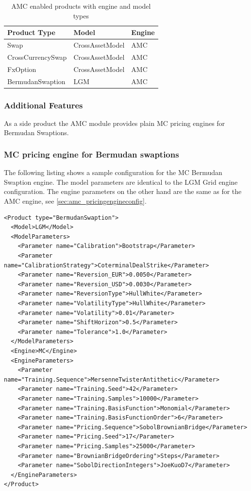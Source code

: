 \begin{table}[hbt]
  \begin{tabular}{l|l|l}
    Product Type & Model & Engine \\ \hline
    Swap & CrossAssetModel & AMC \\
    CrossCurrencySwap & CrossAssetModel & AMC \\
    FxOption & CrossAssetModel & AMC \\
    BermudanSwaption & LGM & AMC \\
  \end{tabular}
  \caption{AMC enabled products with engine and model types}
  \label{tbl:amcconfig}
\end{table}

\subsubsection*{Additional Features}
\label{sec:amc_sideproducts}

As a side product the AMC module provides plain MC pricing engines for Bermudan Swaptions.

\subsubsection*{MC pricing engine for Bermudan swaptions}\label{sec:mc_bermudan_engine}

The following listing shows a sample configuration for the MC Bermudan Swaption engine. The model parameters are
identical to the LGM Grid engine configuration. The engine parameters on the other hand are the same as for the AMC
engine, see \ref{sec:amc_pricingengineconfig}.

\begin{verbatim}
<Product type="BermudanSwaption">
  <Model>LGM</Model>
  <ModelParameters>
    <Parameter name="Calibration">Bootstrap</Parameter>
    <Parameter name="CalibrationStrategy">CoterminalDealStrike</Parameter>
    <Parameter name="Reversion_EUR">0.0050</Parameter>
    <Parameter name="Reversion_USD">0.0030</Parameter>
    <Parameter name="ReversionType">HullWhite</Parameter>
    <Parameter name="VolatilityType">HullWhite</Parameter>
    <Parameter name="Volatility">0.01</Parameter>
    <Parameter name="ShiftHorizon">0.5</Parameter>
    <Parameter name="Tolerance">1.0</Parameter>
  </ModelParameters>
  <Engine>MC</Engine>
  <EngineParameters>
    <Parameter name="Training.Sequence">MersenneTwisterAntithetic</Parameter>
    <Parameter name="Training.Seed">42</Parameter>
    <Parameter name="Training.Samples">10000</Parameter>
    <Parameter name="Training.BasisFunction">Monomial</Parameter>
    <Parameter name="Training.BasisFunctionOrder">6</Parameter>
    <Parameter name="Pricing.Sequence">SobolBrownianBridge</Parameter>
    <Parameter name="Pricing.Seed">17</Parameter>
    <Parameter name="Pricing.Samples">25000</Parameter>
    <Parameter name="BrownianBridgeOrdering">Steps</Parameter>
    <Parameter name="SobolDirectionIntegers">JoeKuoD7</Parameter>
  </EngineParameters>
</Product>
\end{verbatim}

